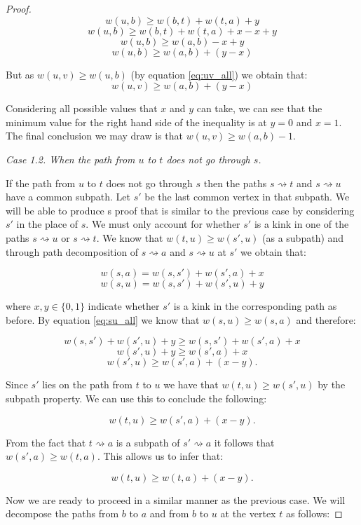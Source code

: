 \begin{proof}
$$ w(u, b) \ge w(b, t) + w(t, a) + y $$
$$ w(u, b) \ge w(b, t) + w(t, a) + x - x + y $$
$$ w(u, b) \ge w(a, b) - x + y $$
$$ w(u, b) \ge w(a, b) + (y - x) $$

But as $w(u, v) \ge w(u, b)$ (by equation \ref{eq:uv_all}) we obtain that:
$$ w(u, v) \ge w(a, b) + (y - x) $$

Considering all possible values that $x$ and $y$ can take, we can see that the minimum value for the right hand side of the inequality is at $y = 0$ and $x = 1$. The final conclusion we may draw is that $w(u, v) \ge w(a, b) -1$.




{\em Case 1.2. When the path from $u$ to $t$ does not go through $s$.}

If the path from $u$ to $t$ does not go through $s$ then the paths $s \rightsquigarrow t$ and $s \rightsquigarrow u$ have a common subpath. Let $s'$ be the last common vertex in that subpath. We will be able to produce s proof that is similar to the previous case by considering $s'$ in the place of $s$. We must only account for whether $s'$ is a kink in one of the paths $s \rightsquigarrow u$ or $s \rightsquigarrow t$. We know that $w(t, u) \ge w(s', u)$ (as a subpath) and through path decomposition of  $s \rightsquigarrow a$ and $s \rightsquigarrow u$ at $s'$ we obtain that:

$$ w(s, a) = w(s, s') + w(s', a) + x $$
$$ w(s, u) = w(s, s') + w(s', u) + y $$

where $x,y \in \{0, 1\}$ indicate whether $s'$ is a kink in the corresponding path as before. By equation \ref{eq:su_all} we know that $w(s, u) \ge w(s, a)$ and therefore:

$$ w(s, s') + w(s', u) + y \ge w(s, s') + w(s', a) + x  $$ 
$$ w(s', u) + y \ge w(s', a) + x $$ 
$$ w(s', u) \ge w(s', a) + (x - y).$$ 

Since $s'$ lies on the path from $t$ to $u$ we have that $w(t, u) \ge w(s', u)$ by the subpath property. We can use this to conclude the following:

$$ w(t, u) \ge w(s', a) + (x - y).$$ 

From the fact that $t \rightsquigarrow a$ is a subpath of $s' \rightsquigarrow a$ it follows that $w(s', a) \ge w(t, a)$. This allows us to infer that:

$$ w(t, u) \ge w(t, a) + (x - y). $$ 

Now we are ready to proceed in a similar manner as the previous case. We will decompose the paths from $b$ to $a$ and from $b$ to $u$ at the vertex $t$ as follows:


\end{proof}
